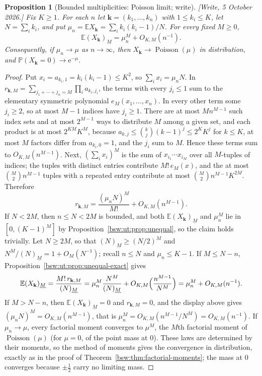 \documentclass[11pt,letterpaper]{article}
\newtheorem{proposition}[theorem]{Proposition}
\theoremstyle{definition}
\theoremstyle{remark}
\newcommand{\EE}{\mathbb E}
\newcommand{\PP}{\mathbb P}
\newcommand{\ee}{\mathrm e}
\newcommand{\fall}[2]{(#1)_{\underline{#2}}}
\newcommand{\Pois}{\operatorname{Poisson}}
\begin{document}
\begin{proposition}[Bounded multiplicities: Poisson limit; write]
\label{bsw:ut:prop:unequal-poisson}
[Write, 5 October 2026.]  Fix $K\ge1$.  For each $n$ let
$\mathbf k=(k_1,\ldots,k_n)$ with $1\le k_i\le K$, let $N=\sum_ik_i$, and
put $\mu_n=\EE X_{\mathbf k}=\sum_ik_i(k_i-1)/N$.  For every fixed
$M\ge0$,
\[
 \EE\fall{X_{\mathbf k}}M=\mu_n^M+O_{K,M}(n^{-1}).
\]
Consequently, if $\mu_n\to\mu$ as $n\to\infty$, then
$X_{\mathbf k}\to\Pois(\mu)$ in distribution, and
$\PP(X_{\mathbf k}=0)\to\ee^{-\mu}$.
\end{proposition}

\begin{proof}
Put $x_i=a_{k_i,1}=k_i(k_i-1)\le K^2$, so $\sum_ix_i=\mu_nN$.  In
$r_{\mathbf k,M}=\sum_{j_1+\cdots+j_n=M}\prod_ia_{k_i,j_i}$, the terms with
every $j_i\le1$ sum to the elementary symmetric polynomial
$e_M(x_1,\ldots,x_n)$.  In every other term some $j_i\ge2$, so at most
$M-1$ indices have $j_i\ge1$.  There are at most $Mn^{M-1}$ such index sets
and at most $2^{M-1}$ ways to distribute $M$ among a given set, and each
product is at most $2^{KM}K^M$, because
$a_{k,j}\le\binom kj(k-1)^j\le2^KK^j$ for $k\le K$, at most $M$ factors
differ from $a_{k_i,0}=1$, and the $j_i$ sum to $M$.  Hence these terms sum
to $O_{K,M}(n^{M-1})$.  Next, $(\sum_ix_i)^M$ is the sum of
$x_{i_1}\cdots x_{i_M}$ over all $M$-tuples of indices; the tuples with
distinct entries contribute $M!\,e_M(x)$, and the at most
$\binom M2n^{M-1}$ tuples with a repeated entry contribute at most
$\binom M2n^{M-1}K^{2M}$.  Therefore
\[
 r_{\mathbf k,M}=\frac{(\mu_nN)^M}{M!}+O_{K,M}(n^{M-1}).
\]
If $N<2M$, then $n\le N<2M$ is bounded, and both
$\EE\fall{X_{\mathbf k}}M$ and $\mu_n^M$ lie in $[0,(K-1)^M]$ by
Proposition~\ref{bsw:ut:prop:unequal}, so the claim holds trivially.  Let
$N\ge2M$, so that $\fall NM\ge(N/2)^M$ and $N^M/\fall NM=1+O_M(N^{-1})$;
recall $n\le N$ and $\mu_n\le K-1$.  If $M\le N-n$,
Proposition~\ref{bsw:ut:prop:unequal-exact} gives
\[
 \EE\fall{X_{\mathbf k}}M=\frac{M!\,r_{\mathbf k,M}}{\fall NM}
 =\mu_n^M\frac{N^M}{\fall NM}
 +O_{K,M}\Bigl(\frac{n^{M-1}}{N^M}\Bigr)
 =\mu_n^M+O_{K,M}(n^{-1}).
\]
If $M>N-n$, then $\EE\fall{X_{\mathbf k}}M=0$ and $r_{\mathbf k,M}=0$, and
the display above gives $(\mu_nN)^M=O_{K,M}(n^{M-1})$, that is
$\mu_n^M=O_{K,M}(n^{M-1}/N^M)=O_{K,M}(n^{-1})$.
If $\mu_n\to\mu$, every factorial moment converges to $\mu^M$, the $M$th
factorial moment of $\Pois(\mu)$ (for $\mu=0$, of the point mass at $0$).
These laws are determined by their moments, so the method of moments gives
the convergence in distribution, exactly as in the proof of
Theorem~\ref{bsw:thm:factorial-moments}; the mass at $0$ converges because
$\pm\frac12$ carry no limiting mass.
\end{proof}
\end{document}
